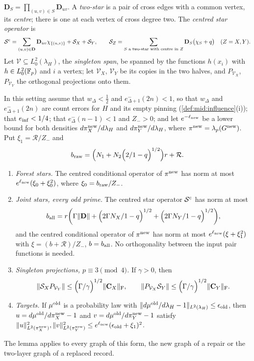 $\mathbf D_S=\prod_{(u,v)\in S}\mathbf D_{uv}$. A \emph{two-star} is a pair of
cross edges with a common vertex, its \emph{centre}; there is one at each vertex
of cross degree two. The \emph{centred star operator} is
\[
 \mathcal S^{\rm c}=\sum_{(u,v)\in\mathbf D}\mathbf D_{uv}\chi_{\{(u,v)\}}
 +\mathcal S_X+\mathcal S_Y,\qquad
 \mathcal S_Z=\sum_{S\text{ a two-star with centre in }Z}\mathbf D_S\bigl(\chi_S+q\bigr)
 \quad(Z=X,Y).
\]
Let $\mathcal V\subseteq L^2_0(\lambda_H)$, the \emph{singleton span}, be spanned
by the functions $h(x_i)$ with $h\in L^2_0(\Fp)$ and $i$ a vertex; let
$\mathcal V_X$, $\mathcal V_Y$ be its copies in the two halves, and
$P_{\mathcal V_X}$, $P_{\mathcal V_Y}$ the orthogonal projections onto them.

\begin{lemma}\label{lem:upper-stars}
In this setting assume that $w_\Delta<\frac12$ and $e^-_{\Delta+1}(2n)<1$, so
that $w_\Delta$ and $e^-_{\Delta+1}(2n)$ are count errors for $H$ and its empty
pinning (\cref{def:mid:influence}(i)); that $e_{\rm inf}<\frac14$; that
$e^-_\Delta(n-1)<1$ and $Z_->0$; and let $e^{-\ell_{\rm new}}$ be a lower
bound for both densities $d\pi^{\rm new}_X/d\lambda_H$ and $d\pi^{\rm new}_Y/d\lambda_H$,
where $\pi^{\rm new}=\lambda_p(G^{\rm new})$. Put $\xi_1=\mathcal R/Z_-$ and
\[
 b_{\rm raw}=\Bigl(N_1+N_2\Bigl(\frac2{1-q}\Bigr)^{1/2}\Bigr)r+\mathcal R .
\]
\begin{enumerate}[label=(\alph*)]
\item\emph{Forest stars.} The centred conditional operator of
 $\pi^{\rm new}$ has norm at most $e^{\ell_{\rm new}}(\xi_0+\xi_0^2)$, where
 $\xi_0=b_{\rm raw}/Z_-$.
\item\emph{Joint stars, every odd prime.} The centred star operator
 $\mathcal S^{\rm c}$ has norm at most
 \begin{equation}\label{eq:frontier:all-prime-star-cap}
  b_{\rm all}=r\biggl(\Gamma\|\mathbf D\|
  +\Bigl(\frac{2\Gamma N_X}{1-q}\Bigr)^{1/2}
  +\Bigl(\frac{2\Gamma N_Y}{1-q}\Bigr)^{1/2}\biggr),
 \end{equation}
 and the centred conditional operator of $\pi^{\rm new}$ has norm at most
 $e^{\ell_{\rm new}}(\xi+\xi_1^2)$ with $\xi=(b+\mathcal R)/Z_-$, $b=b_{\rm all}$.
 No orthogonality between the input pair functions is needed.
\item\emph{Singleton projections, $p\equiv3\pmod4$.} If $\gamma>0$, then
 \[
  \|\mathcal S_XP_{\mathcal V_Y}\|\le\Bigl(\frac\Gamma\gamma\Bigr)^{1/2}\|\mathbf C_X\|_{\rm F},
  \qquad
  \|P_{\mathcal V_X}\mathcal S_Y\|\le\Bigl(\frac\Gamma\gamma\Bigr)^{1/2}\|\mathbf C_Y\|_{\rm F}.
 \]
\item\emph{Targets.} If $\mu^{\rm old}$ is a probability law with
 $\|d\mu^{\rm old}/d\lambda_H-1\|_{L^2(\lambda_H)}\le\epsilon_{\rm old}$, then
 $u=d\mu^{\rm old}/d\pi^{\rm new}_X-1$ and $v=d\mu^{\rm old}/d\pi^{\rm new}_Y-1$
 satisfy
 $\|u\|^2_{L^2(\pi^{\rm new}_X)},\|v\|^2_{L^2(\pi^{\rm new}_Y)}
 \le e^{\ell_{\rm new}}(\epsilon_{\rm old}+\xi_1)^2$.
\end{enumerate}
The lemma applies to every graph of this form, the new graph of a repair or the
two-layer graph of a replaced record.
\end{lemma}

